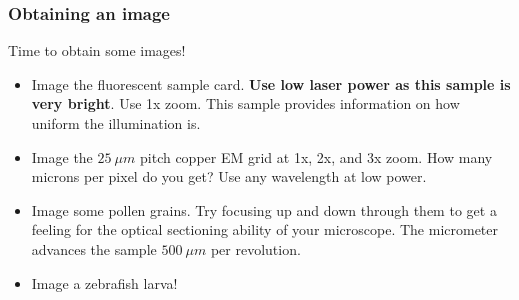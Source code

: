 \documentclass[a4paper]{report}
\begin{document}
\subsubsection{Obtaining an image}
Time to obtain some images!
\begin{itemize}
\item Image the fluorescent sample card. 
\textbf{Use low laser power as this sample is very bright}. 
Use 1x zoom. 
This sample provides information on how uniform the illumination is.

\item Image the $25~\mu m$ pitch copper EM grid at 1x, 2x, and 3x zoom. 
How many microns per pixel do you get?
Use any wavelength at low power. 

\item Image some pollen grains. 
Try focusing up and down through them to get a feeling for the optical sectioning ability of your microscope. 
The micrometer advances the sample $500~\mu m$ per revolution. 

\item Image a zebrafish larva!

\end{itemize}
\end{document}
